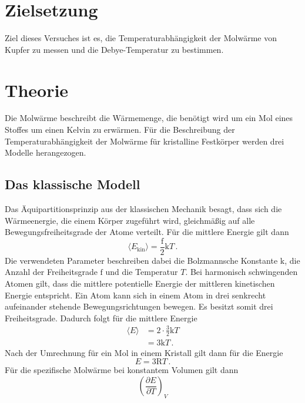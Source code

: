 \section{Zielsetzung}
Ziel dieses Versuches ist es, die Temperaturabhängigkeit der Molwärme von Kupfer
zu messen und die Debye-Temperatur zu bestimmen.
\section{Theorie}
Die Molwärme beschreibt die Wärmemenge, die benötigt wird um ein Mol eines
Stoffes um einen Kelvin zu erwärmen. Für die Beschreibung der
Temperaturabhängigkeit der Molwärme für kristalline Festkörper
werden drei Modelle herangezogen.

\subsection{Das klassische Modell}
Das Äquipartitionsprinzip aus der klassischen Mechanik besagt, dass sich die
Wärmeenergie, die einem Körper zugeführt wird, gleichmäßig auf alle
Bewegungsfreiheitsgrade der Atome verteilt. Für die mittlere Energie gilt dann
\begin{equation}
  \langle E_{\text{kin}} \rangle = \frac{\text{f}}{2} \text{k} T \, .
\end{equation}
Die verwendeten Parameter beschreiben dabei die Bolzmannsche Konstante
$\text{k}$, die Anzahl der Freiheitsgrade $\text{f}$ und die Temperatur $T$. Bei
harmonisch schwingenden Atomen gilt, dass die mittlere potentielle Energie
der mittleren kinetischen Energie entspricht. Ein Atom kann sich in einem
Atom in drei senkrecht aufeinander stehende Bewegungsrichtungen bewegen. Es
besitzt somit drei Freiheitsgrade. Dadurch folgt für die mittlere Energie
\begin{align*}
  \langle E \rangle &= 2 \cdot \frac{3}{2} \text{k} T \\
                    &= 3 \text{k} T  \, .
\end{align*}
Nach der Umrechnung für ein Mol in einem Kristall gilt dann für die Energie
\begin{equation}
  E = 3 \text{R} T \, .
\end{equation}
Für die spezifische Molwärme bei konstantem Volumen gilt dann
\begin{equation}
  \left(\frac{\partial E}{\partial T}\right)_{\!\! V}
\end{equation}
